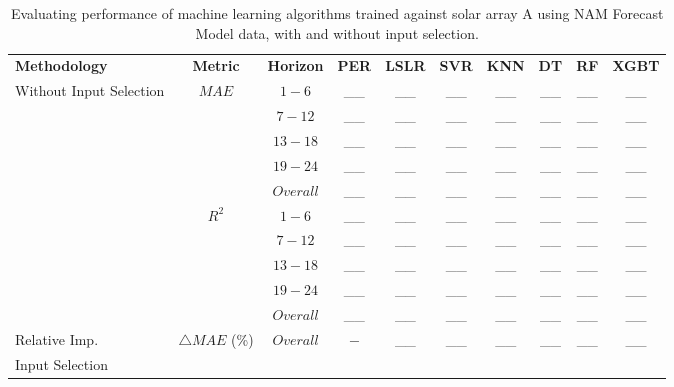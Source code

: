 \begin{table}[h]
\begin{center}
    \caption{Evaluating performance of machine learning algorithms trained against solar array A using NAM Forecast Model data, with and without input selection.}
    \vspace{0.2cm}
    \label{Tab:fs_array_a}
    \begin{tabular}{@{}p{5.3em}ccccccccc@{}}
    \toprule
    \textbf{Methodology} & \textbf{Metric} & \textbf{Horizon} & \textbf{PER} & \textbf{LSLR} & \textbf{SVR} & \textbf{KNN} & \textbf{DT} & \textbf{RF} & \textbf{XGBT} \\ \cmidrule(l){1-10} 
    \multirow{10}{5em}{Without Input Selection} & \multirow{5}{*}{$MAE$} & $1 - 6$ & \_\_ & \_\_ & \_\_ & \_\_ & \_\_ & \_\_ & \_\_ \\
                                              &                   & $7 - 12$ & \_\_ & \_\_ & \_\_ & \_\_ & \_\_ & \_\_ & \_\_ \\
                                              &                   & $13 - 18$ & \_\_ & \_\_ & \_\_ & \_\_ & \_\_ & \_\_ & \_\_ \\
                                              &                   & $19 - 24$ & \_\_ & \_\_ & \_\_ & \_\_ & \_\_ & \_\_ & \_\_ \\
                                              &                   & $Overall$ & \_\_ & \_\_ & \_\_ & \_\_ & \_\_ & \_\_ & \_\_ \\ \cmidrule(lr){2-10}
                                              & \multirow{5}{*}{$R^2$} & $1 - 6$ & \_\_ & \_\_ & \_\_ & \_\_ & \_\_ & \_\_ & \_\_ \\
                                              &                   & $7 - 12$ & \_\_ & \_\_ & \_\_ & \_\_ & \_\_ & \_\_ & \_\_ \\
                                              &                   & $13 - 18$ & \_\_ & \_\_ & \_\_ & \_\_ & \_\_ & \_\_ & \_\_ \\
                                              &                   & $19 - 24$ & \_\_ & \_\_ & \_\_ & \_\_ & \_\_ & \_\_ & \_\_ \\
                                              &                   & $Overall$ & \_\_ & \_\_ & \_\_ & \_\_ & \_\_ & \_\_ & \_\_ \\ 
    \midrule
    Relative Imp. & $\bigtriangleup MAE$ (\%)  & $Overall$ & $-$ & \_\_ & \_\_ & \_\_ & \_\_ & \_\_ & \_\_ \\ 
    \midrule
    \multirow{10}{5em}{Input Selection}

\end{tabular}
\end{center}
\end{table}
